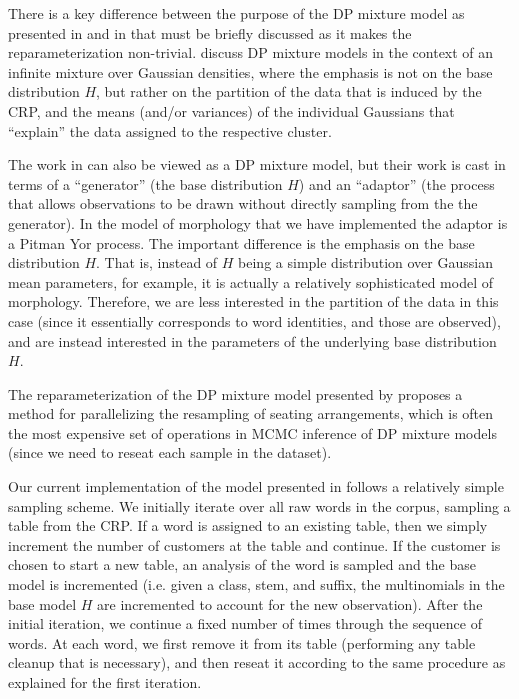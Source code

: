 \documentclass{article}
\begin{document}
There is a key difference between the purpose of the DP mixture model
as presented in \cite{lovell2012} and in \cite{goldwater2011} that
must be briefly discussed as it makes the reparameterization
non-trivial. \cite{lovell2012} discuss DP mixture models in the
context of an infinite mixture over Gaussian densities, where the
emphasis is not on the base distribution $H$, but rather on the
partition of the data that is induced by the CRP, and the means
(and/or variances) of the individual Gaussians that ``explain'' the
data assigned to the respective cluster.

The work in \cite{goldwater2011} can also be viewed as a DP mixture
model, but their work is cast in terms of a ``generator'' (the base
distribution $H$) and an ``adaptor'' (the process that allows
observations to be drawn without directly sampling from the the
generator). In the model of morphology that we have implemented the
adaptor is a Pitman Yor process. The important difference is the
emphasis on the base distribution $H$. That is, instead of $H$ being a
simple distribution over Gaussian mean parameters, for example, it is
actually a relatively sophisticated model of morphology. Therefore, we
are less interested in the partition of the data in this case (since
it essentially corresponds to word identities, and those are
observed), and are instead interested in the parameters of the
underlying base distribution $H$.

The reparameterization of the DP mixture model presented by
\cite{lovell2012} proposes a method for parallelizing the resampling
of seating arrangements, which is often the most expensive set of
operations in MCMC inference of DP mixture models (since we need to
reseat each sample in the dataset).

Our current implementation of the model presented in
\cite{goldwater2011} follows a relatively simple sampling scheme. We
initially iterate over all raw words in the corpus, sampling a table
from the CRP. If a word is assigned to an existing table, then we
simply increment the number of customers at the table and continue. If
the customer is chosen to start a new table, an analysis of the word
is sampled and the base model is incremented (i.e. given a class,
stem, and suffix, the multinomials in the base model $H$ are
incremented to account for the new observation). After the initial
iteration, we continue a fixed number of times through the sequence of
words. At each word, we first remove it from its table (performing any
table cleanup that is necessary), and then reseat it according to the
same procedure as explained for the first iteration.
\end{document}
